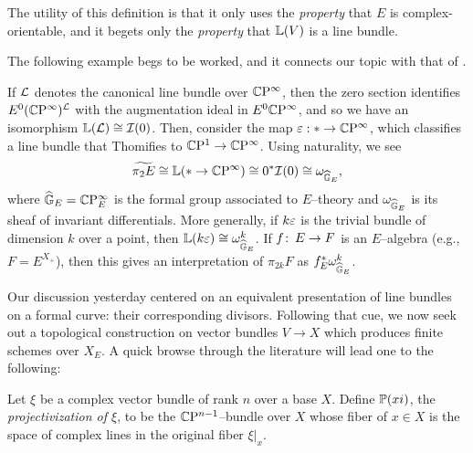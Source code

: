 \begin{remark}
The utility of this definition is that it only uses the \emph{property} that $E$ is complex-orientable, and it begets only the \emph{property} that $\ThomSheaf{V}$ is a line bundle.
\end{remark}

The following example begs to be worked, and it connects our topic with that of .
\begin{example}
If $\L$ denotes the canonical line bundle over $\CP^\infty$, then the zero section identifies $E^0 (\CP^\infty)^{\L}$ with the augmentation ideal in $E^0 \CP^\infty$, and so we have an isomorphism $\ThomSheaf{\L} \cong \sheaf I(0)$.  Then, consider the map $\eps: * \to \CP^\infty$, which classifies a line bundle that Thomifies to $\CP^1 \to \CP^\infty$.  Using naturality, we see \[\widetilde{\pi_2 E} \cong \ThomSheaf{* \to \CP^\infty} \cong 0^* \sheaf I(0) \cong \omega_{\G_E},\] where $\G_E = \CP^\infty_E$ is the formal group associated to $E$--theory and $\omega_{\G_E}$ is its sheaf of invariant differentials.  More generally, if $k \eps$ is the trivial bundle of dimension $k$ over a point, then $\ThomSheaf{k \eps} \cong \omega_{\G_E}^k$.  If $f \co E \to F$ is an $E$--algebra (e.g., $F = E^{X_+}$), then this gives an interpretation of $\pi_{2k} F$ as $f_E^* \omega_{\G_E}^k$.
\end{example}

Our discussion yesterday centered on an equivalent presentation of line bundles on a formal curve: their corresponding divisors.  Following that cue, we now seek out a topological construction on vector bundles $V \to X$ which produces finite schemes over $X_E$.  A quick browse through the literature will lead one to the following:
\begin{definition}
Let $\xi$ be a complex vector bundle of rank $n$ over a base $X$.  Define $\P(xi)$, the \textit{projectivization of $\xi$}, to be the $\CP^{n-1}$--bundle over $X$ whose fiber of $x \in X$ is the space of complex lines in the original fiber $\xi|_x$.
\end{definition}

